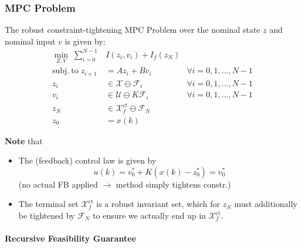 \subsubsection{MPC Problem}
The robust constraint-tightening MPC Problem over the nominal state $z$ and nominal input $v$ is given by:
\begin{align*}
    \min_{Z,V}\;         \sum_{i=0}^{N-1}                                                               & I(z_{i},v_{i})+I_{f}(z_{N})                                                \\
    \mathrm{subj.~to}\;                                                                         z_{i+1} & =Az_{i}+Bv_{i}                               & \forall i=0, 1, \ldots, N-1 \\
    z_{i}                                                                                               & \in\mathcal{X}\ominus\mathcal{F}_{i}         & \forall i=0, 1, \ldots, N-1 \\
    v_i                                                                                                 & \in\mathcal{U}\ominus K\mathcal{F}_i         & \forall i=0, 1, \ldots, N-1 \\
    z_{N}                                                                                               & \in\mathcal{X}_{f}^{ct}\ominus \mathcal{F}_N                               \\
    z_0                                                                                                 & =x(k)
\end{align*}



\textbf{Note} that
\begin{itemize}
    \item The (feedback) control law is given by
          \begin{equation*}
              u(k) = v_0^* + K(x(k) - z_0^*) = v_0^*
          \end{equation*}
          (no actual FB applied $\rightarrow$ method simply tightens constr.)
    \item The terminal set $\mathcal{X}_f^{\mathrm{ct}}$ is a robust invariant set, which for $z_{N}$ must additionally be tightened by $\mathcal{F}_N$ to ensure we actually end up in $\mathcal{X}_f^{\mathrm{ct}}$.
\end{itemize}

\paragraph{Recursive Feasibility Guarantee}

